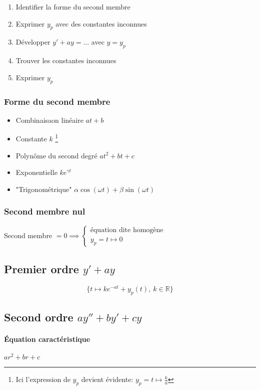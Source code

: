 \documentclass{article}
\newcommand{\R}{{\mathbb R}}
\begin{document}
\begin{enumerate}
	\item Identifier la forme du second membre
	\item Exprimer $y_p$ avec des constantes inconnues
	\item Développer $y' + ay = \ldots$ avec $y = y_p$
	\item Trouver les constantes inconnues
	\item Exprimer $y_p$
\end{enumerate}

\subsubsection{Forme du second membre}

\begin{itemize}
	\item Combinaisaon linéaire $at+b$
	\item Constante $k$ \footnote{Ici l'expression de $y_p$ devient évidente: $y_p = t\mapsto \frac{k}{a}$}
	\item Polynôme du second degré $at^2+bt+c$
	\item Exponentielle $ke^{\gamma t}$
	\item "Trigonométrique" $\alpha \cos(\omega t) + \beta \sin(\omega t)$
\end{itemize}


\subsubsection{Second membre nul}

Second membre $= 0 \implies \begin{cases}
	\text{équation dite homogène} \\
	y_p = t\mapsto 0
\end{cases}$


\subsection{Premier ordre $y' + ay$}

\[
	\{t\mapsto ke^{-at} + y_p(t),\ k\in \R\} 
\] 

\subsection{Second ordre $ay'' + by' + cy$}

\paragraph{Équation caractéristique} $ar^2 + br + c$
\end{document}
